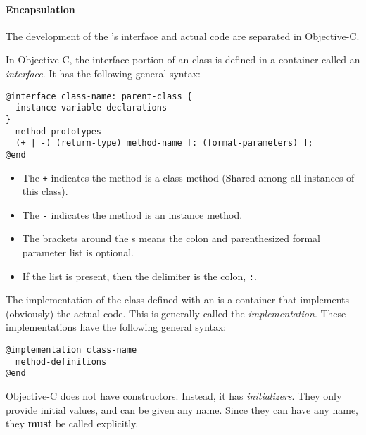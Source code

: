 \paragraph{Encapsulation}\label{par:Objective_C_Encapsulation}
The development of the 's interface and actual code are separated in Objective-C.
\begin{definition}[Interface]\label{def:Objective_C_Class_Interface}
  In Objective-C, the interface portion of an  class is defined in a container called an \emph{interface}.
  It has the following general syntax:
\begin{verbatim}
@interface class-name: parent-class {
  instance-variable-declarations
}
  method-prototypes
  (+ | -) (return-type) method-name [: (formal-parameters) ];
@end
\end{verbatim}
  \begin{itemize}[noitemsep]
  \item The \texttt{+} indicates the method is a class method (Shared among all instances of this class).
  \item The \texttt{-} indicates the method is an instance method.
  \item The brackets around the s means the colon and parenthesized formal parameter list is optional.
  \item If the list is present, then the delimiter is the colon, \texttt{:}.
  \end{itemize}
\end{definition}

\begin{definition}[Implementation]\label{def:Objective_C_Class_Implementation}
  The implementation of the  class defined with an  is a container that implements (obviously) the actual code.
  This is generally called the \emph{implementation}.
  These implementations have the following general syntax:
\begin{verbatim}
@implementation class-name
  method-definitions
@end
\end{verbatim}
\end{definition}

\begin{definition}[Initializers]\label{def:Objective_C_Class_Initializers}
  Objective-C does not have constructors.
  Instead, it has \emph{initializers}.
  They only provide initial values, and can be given any name.
  Since they can have any name, they \textbf{must} be called explicitly.
\end{definition}

